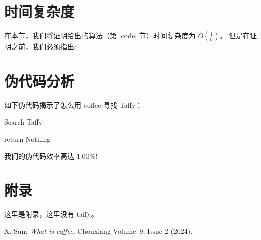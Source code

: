 \documentclass{ctexart}
\begin{document}
  \section{时间复杂度}
    在本节，我们将证明给出的算法（第 \ref{code} 节）时间复杂度为 \( O(\frac{1}{n}) \)。  %
    但是在证明之前，我们必须指出:


  \section{伪代码分析}
    如下伪代码揭示了怎么用 coffee 寻找 Taffy：

  \begin{algorithm}[H]
  \SetAlgoLined
  
  \caption{Search Taffy}  %

  


  return Nothing\;  %
  \end{algorithm}    

  我们的伪代码效率高达 1.00\%!


  \appendix
  \section{附录}
    这里是附录，这里没有 taffy。




  \begin{thebibliography}{10}
	    X. Sun: \emph{What is coffee}, Chouxiang Volume~9, Issue 2 (2024).
  \end{thebibliography}
\end{document}
